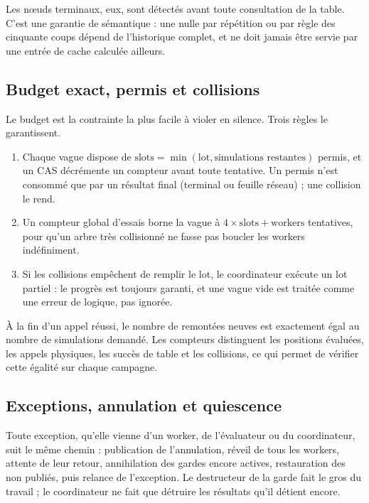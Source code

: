 Les n\oe{}uds terminaux, eux, sont d\'etect\'es avant toute consultation de
la table. C'est une garantie de s\'emantique : une nulle par r\'ep\'etition
ou par r\`egle des cinquante coups d\'epend de l'historique complet, et ne
doit jamais \^etre servie par une entr\'ee de cache calcul\'ee ailleurs.

\subsection{Budget exact, permis et collisions}

Le budget est la contrainte la plus facile \`a violer en silence. Trois
r\`egles le garantissent.

\begin{enumerate}[leftmargin=1.4em]
  \item Chaque vague dispose de $\text{slots} = \min(\text{lot},
  \text{simulations restantes})$ permis, et un CAS d\'ecr\'emente un compteur
   avant toute tentative. Un permis n'est consomm\'e que par
  un r\'esultat final (terminal ou feuille r\'eseau) ; une collision le rend.
  \item Un compteur global d'essais borne la vague \`a $4 \times \text{slots}
  + \text{workers}$ tentatives, pour qu'un arbre tr\`es collisionn\'e ne fasse
  pas boucler les workers ind\'efiniment.
  \item Si les collisions emp\^echent de remplir le lot, le coordinateur
  ex\'ecute un lot partiel : le progr\`es est toujours garanti, et une vague
  vide est trait\'ee comme une erreur de logique, pas ignor\'ee.
\end{enumerate}

\`A la fin d'un appel r\'eussi, le nombre de remont\'ees neuves est exactement
\'egal au nombre de simulations demand\'e. Les compteurs distinguent les
positions \'evalu\'ees, les appels physiques, les succ\`es de table et les
collisions, ce qui permet de v\'erifier cette \'egalit\'e sur chaque
campagne.

\subsection{Exceptions, annulation et quiescence}

Toute exception, qu'elle vienne d'un worker, de l'\'evaluateur ou du
coordinateur, suit le m\^eme chemin : publication de l'annulation, r\'eveil
de tous les workers, attente de leur retour, annihilation des gardes encore
actives, restauration des  non publi\'es, puis relance de
l'exception. Le destructeur de la garde fait le gros du travail ; le
coordinateur ne fait que d\'etruire les r\'esultats qu'il d\'etient encore.

